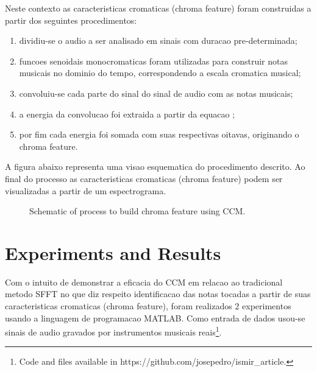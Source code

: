 \documentclass{article}
\begin{document}
	Neste contexto as caracteristicas cromaticas (chroma feature) foram construidas a partir dos seguintes procedimentos:
	\begin{enumerate}
		\item dividiu-se o audio a ser analisado em sinais com duracao pre-determinada;
		\item funcoes senoidais monocromaticas foram utilizadas para construir notas musicais no dominio do tempo, correspondendo a escala cromatica musical; 
		\item convoluiu-se cada parte do sinal do sinal de audio com as notas musicais;
		\item a energia da convolucao foi extraida a partir da equacao ;
		\item por fim cada energia foi somada com suas respectivas oitavas, originando o chroma feature.
	\end{enumerate}

	A figura abaixo representa uma visao esquematica do procedimento descrito. Ao final do processo as caracteristicas cromaticas (chroma feature) podem ser visualizadas a partir de um espectrograma.

	\begin{figure}[h]
	 \centerline{}
	 \caption{Schematic of process to build chroma feature using CCM.}
	 \label{fig:schematic}
	\end{figure}


\section{Experiments and Results}

	Com o intuito de demonstrar a eficacia do CCM em relacao ao tradicional metodo SFFT\cite{LabROSA} no que diz respeito identificacao das notas tocadas a partir de suas caracteristicas cromaticas (chroma feature),  foram realizados 2 experimentos usando a linguagem de programacao MATLAB. Como entrada de dados usou-se sinais de audio gravados por instrumentos musicais reais\footnote{Code and files available in https://github.com/josepedro/ismir\_article.}. 
\end{document}
